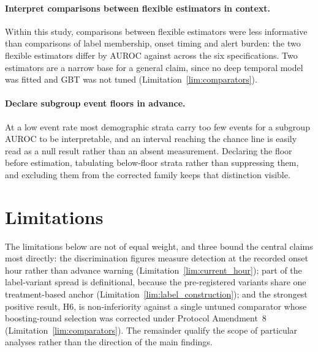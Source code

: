 \paragraph{Interpret comparisons between flexible estimators in context.}
Within this study, comparisons between flexible estimators were less
informative than comparisons of label membership, onset timing and alert
burden: the two flexible estimators differ by \pcHSixAbsEst{} AUROC against
\pcSpreadModelClass{} across the six specifications. Two estimators are a
narrow base for a general claim, since no deep temporal model was fitted and
GBT was not tuned (Limitation~\ref{lim:comparators}).

\paragraph{Declare subgroup event floors in advance.} At a low event rate most
demographic strata carry too few events for a subgroup AUROC to be
interpretable, and an interval reaching the chance line is easily read as a
null result rather than an absent measurement. Declaring the floor before
estimation, tabulating below-floor strata rather than suppressing them, and
excluding them from the corrected family keeps that distinction visible.


\section{Limitations}
\label{sec:limitations}

The limitations below are not of equal weight, and three bound the central
claims most directly: the discrimination figures measure detection at the
recorded onset hour rather than advance warning
(Limitation~\ref{lim:current_hour}); part of the label-variant spread is
definitional, because the pre-registered variants share one treatment-based
anchor (Limitation~\ref{lim:label_construction}); and the strongest positive
result, H6, is non-inferiority against a single untuned comparator whose
boosting-round selection was corrected under Protocol Amendment~8
(Limitation~\ref{lim:comparators}). The remainder qualify the scope of
particular analyses rather than the direction of the main findings.

